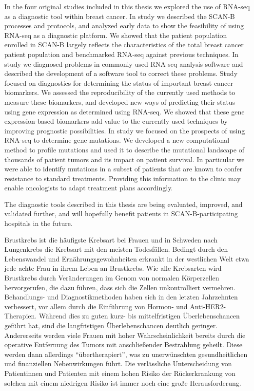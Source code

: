 \documentclass[11pt]{book}
\newcommand{\scanb}{\mbox{SCAN-B}}
\begin{document}
In the four original studies included in this thesis we explored the use of RNA-seq as a diagnostic tool within breast cancer. In study \I we described the \scanb{} processes and protocols, and analyzed early data to show the feasibility of using RNA-seq as a diagnostic platform. We showed that the patient population enrolled in \scanb{} largely reflects the characteristics of the total breast cancer patient population and benchmarked RNA-seq against previous techniques. In study \II we diagnosed problems in commonly used RNA-seq analysis software and described the development of a software tool to correct these problems. Study \III focused on diagnostics for determining the status of important breast cancer biomarkers. We assessed the reproducibility of the currently used methods to measure these biomarkers, and developed new ways of predicting their status using gene expression as determined using RNA-seq. We showed that these gene expression-based biomarkers add value to the currently used techniques by improving prognostic possibilities. In study \IV we focused on the prospects of using RNA-seq to determine gene mutations. We developed a new computational method to profile mutations and used it to describe the mutational landscape of thousands of patient tumors and its impact on patient survival. In particular we were able to identify mutations in a subset of patients that are known to confer resistance to standard treatments. Providing this information to the clinic may enable oncologists to adapt treatment plans accordingly.

The diagnostic tools described in this thesis are being evaluated, improved, and validated further, and will hopefully benefit patients in \scanb{}-participating hospitals in the future.



Brustkrebs ist die häufigste Krebsart bei Frauen und in Schweden nach Lungenkrebs die Krebsart mit den meisten Todesfällen. Bedingt durch den Lebenswandel und Ernährungsgewohnheiten erkrankt in der westlichen Welt etwa jede achte Frau in ihrem Leben an Brustkrebs. Wie alle Krebsarten wird Brustkrebs durch Veränderungen im Genom von normalen Körperzellen hervorgerufen, die dazu führen, dass sich die Zellen unkontrolliert vermehren. Behandlungs- und Diagnostikmethoden haben sich in den letzten Jahrzehnten verbessert, vor allem durch die Einführung von Hormon- und Anti-HER2-Therapien. Während dies zu guten kurz- bis mittelfristigen Überlebenschancen geführt hat, sind die langfristigen Überlebenschancen deutlich geringer. Andererseits werden viele Frauen mit hoher Wahrscheinlichkeit bereits durch die operative Entfernung des Tumors mit anschließender Bestrahlung geheilt. Diese werden dann allerdings ``übertherapiert'', was zu unerwünschten gesundheitlichen und finanziellen Nebenwirkungen führt. Die verlässliche Unterscheidung von Patientinnen und Patienten mit einem hohen Risiko der Rückerkrankung von solchen mit einem niedrigen Risiko ist immer noch eine große Herausforderung.
\end{document}

